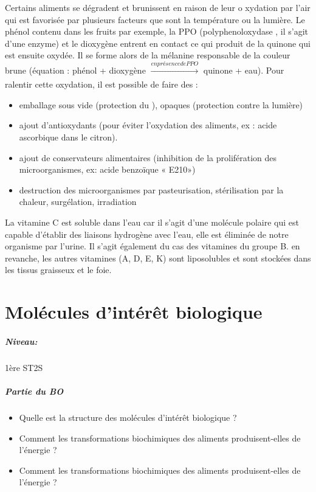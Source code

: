 \documentclass[11pt]{report}
\numberwithin{figure}{section}
\numberwithin{equation}{section}
\numberwithin{table}{section}
\newcommand{\1}{\boldsymbol{1}}
\begin{document}
Certains aliments se dégradent et brunissent en raison de leur o
xydation par l’air
qui est
favorisée par
plusieurs
facteurs que sont
la température ou la lumière. Le phénol
contenu dans les fruits par exemple, la PPO
(polyphenoloxydase , il s’agit d’une enzyme) et le dioxygène entrent en contact ce qui produit de la quinone qui est ensuite oxydée.
Il se forme alors de la mélanine responsable de la couleur brune (équation : phénol + dioxygène $\xrightarrow[]{en présence de PPO}$ quinone + eau). Pour ralentir cette oxydation, il est possible de faire des :
\begin{itemize}
\item emballage sous vide (protection du ), opaques (protection contre la lumière)
\item ajout d’antioxydants (pour éviter l’oxydation des aliments, ex : acide ascorbique dans le citron).
\item ajout de conservateurs alimentaires (inhibition de la prolifération des microorganismes, ex: acide benzoïque «
E210»)
\item destruction des microorganismes par pasteurisation, stérilisation par la chaleur, surgélation, irradiation
\end{itemize}

La vitamine C est soluble dans l’eau car
il s’agit d’une molécule polaire qui est capable d’établir des liaisons hydrogène
avec l’eau, elle est éliminée de notre organisme par l’urine. Il s’agit également du cas des vitamines du groupe B. en
revanche, les autres vitamines (A, D, E, K) sont liposolubles et sont stockées dans les tissus graisseux et le foie.

\chapter{Molécules d'intérêt biologique}

\paragraph*{Niveau:} 1ère ST2S

\paragraph{Partie du BO}
\begin{itemize}
\item Quelle est la structure des molécules d’intérêt biologique ?
\item Comment les transformations biochimiques des aliments produisent-elles de l’énergie ?
\item Comment les transformations biochimiques des aliments produisent-elles de l’énergie ?
\end{itemize}
\end{document}
